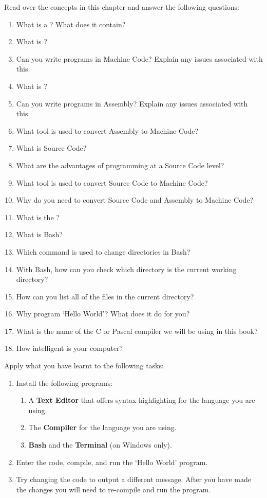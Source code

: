 Read over the concepts in this chapter and answer the following questions:
\begin{enumerate}
  \item What is a ? What does it contain?
  \item What is ?
  \item Can you write programs in Machine Code? Explain any issues associated with this.
  \item What is ?
  \item Can you write programs in Assembly? Explain any issues associated with this.
  \item What tool is used to convert Assembly to Machine Code?
  \item What is Source Code?
  \item What are the advantages of programming at a Source Code level?
  \item What tool is used to convert Source Code to Machine Code?
  \item Why do you need to convert Source Code and Assembly to Machine Code?
  \item What is the ? 
  \item What is Bash?
  \item Which command is used to change directories in Bash?
  \item With Bash, how can you check which directory is the current working directory?
  \item How can you list all of the files in the current directory?
  \item Why program `Hello World'? What does it do for you?
  \item What is the name of the C or Pascal compiler we will be using in this book?
  \item How intelligent is your computer?
\end{enumerate}

\medskip
Apply what you have learnt to the following tasks:

\begin{enumerate}
  \item Install the following programs:
  \begin{enumerate}
    \item A \textbf{Text Editor} that offers syntax highlighting for the language you are using.
    \item The \textbf{Compiler} for the language you are using.
    \item \textbf{Bash} and the \textbf{Terminal} (on Windows only).
  \end{enumerate}
  \item Enter the code, compile, and run the `Hello World' program.
  \item Try changing the code to output a different message. After you have made the changes you will need to re-compile and run the program.
\end{enumerate}

